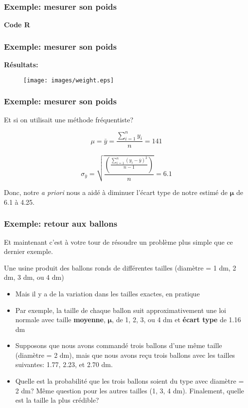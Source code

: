 \documentclass{beamer}
\begin{document}
\begin{frame}[fragile]
    \frametitle{Exemple: mesurer son poids}
    \textbf{Code R}
    \fontsize{9}{11}\selectfont
    
\end{frame}


\begin{frame}
    \frametitle{Exemple: mesurer son poids}
    \textbf{Résultats:}
    \begin{figure}
      \centering
      \texttt{[image: images/weight.eps]}
    \end{figure}
\end{frame}


\begin{frame}
    \frametitle{Exemple: mesurer son poids}
    Et si on utilisait une méthode fréquentiste?

    \pause

    \vfill

    \[\mu = \bar{y} = \frac{\sum_{i=1}^{n} y_i}{n} = 141\]

    \pause

    \vfill

    \[\sigma_{\bar{y}} = \sqrt{\frac{\left(\frac{\sum_{i=1}^{n} (y_i - \bar{y})^2}{n-1}\right)}{n}} = 6.1\]

    \pause

    \vfill

    Donc, notre \emph{a priori} nous a aidé à diminuer l'écart type de notre estimé de $\boldsymbol{\mu}$
    de 6.1 à 4.25.
\end{frame}


\begin{frame}
    \frametitle{Exemple: retour aux ballons}
    Et maintenant c'est à votre tour de résoudre un problème plus simple que ce dernier exemple.

    \pause

    \vfill

    Une usine produit des ballons ronds de différentes tailles (diamètre = 1 dm, 2 dm, 3 dm, ou 4 dm) \pause
    \begin{itemize}
      \item Mais il y a de la variation dans les tailles exactes, en pratique
      \pause
      \item Par exemple, la taille de chaque ballon suit approximativement une loi normale avec
            taille \textbf{moyenne}, $\boldsymbol{\mu}$, de 1, 2, 3, ou 4 dm et \textbf{écart type} de 1.16 dm
      \pause
      \item Supposons que nous avons commandé trois ballons d'une même taille (diamètre = 2 dm),
            mais que nous avons reçu trois ballons avec les tailles suivantes: 1.77, 2.23, et 2.70 dm.
      \pause
      \item Quelle est la probabilité que les trois ballons soient du type avec diamètre = 2 dm?
            Même question pour les autres tailles (1, 3, 4 dm). Finalement, quelle est la
            taille la plus crédible?
    \end{itemize}
\end{frame}
\end{document}

